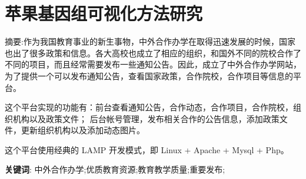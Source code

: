 \chapter*{苹果基因组可视化方法研究}

\vspace{1em}
摘要:作为我国教育事业的新生事物，中外合作办学在取得迅速发展的时候，国家也出了很多政策和信息。各大高校也成立了相应的组织，和国外不同的院校合作了不同的项目，而且经常需要发布一些通知公告。因此，成立了中外合作办学网站，为了提供一个可以发布通知公告，查看国家政策，合作院校，合作项目等信息的平台。

这个平台实现的功能有：前台查看通知公告，合作动态，合作项目，合作院校，组织机构以及政策文件； 后台帐号管理，发布相关合作的公告信息，添加政策文件，更新组织机构以及添加动态图片。

这个平台使用经典的 LAMP 开发模式，即 Linux + Apache + Mysql + Php。

\vspace{1em}

\noindent\textbf{关键词}: 中外合作办学;优质教育资源;教育教学质量;重要发布;